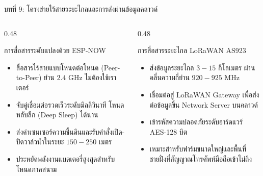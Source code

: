 \documentclass[aspectratio=169, 10pt]{beamer}
\begin{document}
\begin{frame}{บทที่ 9: โครงข่ายไร้สายระยะไกลและการส่งผ่านข้อมูลคลาวด์}
\begin{columns}[T]
    \begin{column}{0.48\textwidth}
        \begin{mastercard}{การสื่อสารระดับแปลงด้วย ESP-NOW}
            \begin{itemize}
                \item สื่อสารไร้สายแบบโหนดต่อโหนด (Peer-to-Peer) ย่าน $2.4\text{ GHz}$ ไม่ต้องใช้เราเตอร์
                \item จับคู่เชื่อมต่อรวดเร็วระดับมิลลิวินาที โหนดหลับลึก (Deep Sleep) ได้นาน
                \item ส่งค่าเซนเซอร์ความชื้นดินและรับคำสั่งเปิด-ปิดวาล์วน้ำในระยะ $150 - 250\text{ เมตร}$
                \item ประหยัดพลังงานแบตเตอรี่สูงสุดสำหรับโหนดภาคสนาม
            \end{itemize}
        \end{mastercard}
    \end{column}
    \begin{column}{0.48\textwidth}
        \begin{goldcard}{การสื่อสารระยะไกล LoRaWAN AS923}
            \begin{itemize}
                \item ส่งข้อมูลระยะไกล $3 - 15\text{ กิโลเมตร}$ ผ่านคลื่นความถี่ย่าน $920 - 925\text{ MHz}$
                \item เชื่อมต่อสู่ LoRaWAN Gateway เพื่อส่งต่อข้อมูลขึ้น Network Server บนคลาวด์
                \item เข้ารหัสความปลอดภัยระดับฮาร์ดแวร์ AES-128 บิต
                \item เหมาะสำหรับฟาร์มขนาดใหญ่และพื้นที่ชายฝั่งที่สัญญาณโทรศัพท์มือถือเข้าไม่ถึง
            \end{itemize}
        \end{goldcard}
    \end{column}
\end{columns}
\end{frame}
\end{document}
